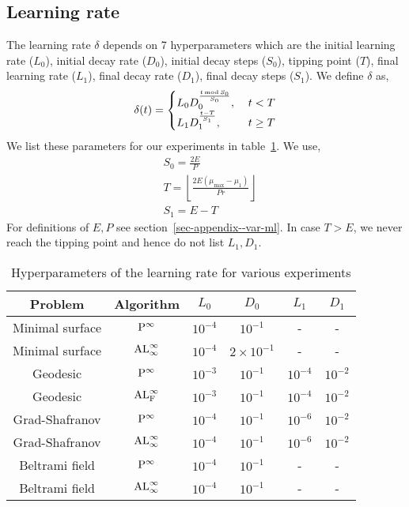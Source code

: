 \subsection{Learning rate}\label{ssec-rate--var-ml}
The learning rate $\delta$ depends on 7 hyperparameters which are the initial learning rate ($L_0$), initial decay rate ($D_0$), initial decay steps ($S_0$), tipping point ($T$), final learning rate ($L_1$), final decay rate ($D_1$), final decay steps ($S_1$). We define $\delta$ as,
\begin{align}
    \delta(t)=\begin{cases}
         L_0D_0^{\frac{t\,{\rm mod }\,S_0}{S_0}},\;&t<T\\
         L_1D_1^{\frac{t-T}{S_1}},\;&t\ge T\\
    \end{cases}
\end{align}
We list these parameters for our experiments in table~\ref{tab:rate--var-ml}. We use,
\begin{align}
    &S_0 = \frac{2E}{P}\\
    &T=\left\lfloor\frac{2E(\mu_{\max}-\mu_1)}{Pr}\right\rfloor\\
    &S_1=E-T
\end{align}
For definitions of $E,P$ see section~\ref{sec-appendix--var-ml}. In case $T>E$, we never reach the tipping point and hence do not list $L_1, D_1$.
\begin{table}[!ht]
\begin{center}
\begin{tabular}{ |c|c|c|c|c|c| } 
    \hline
    Problem & Algorithm& $L_0$ & $D_0$ &  $L_1$ & $D_1$ \\ 
    \hline
    Minimal surface& ${\rm P}^\infty$ & $10^{-4}$ & $10^{-1}$  &- &- \\
    \hline
    Minimal surface &${\rm AL}_\infty^\infty$ & $10^{-4}$ & $2\times10^{-1}$  &- &- \\
    \hline
    Geodesic&${\rm P}^\infty$ & $10^{-3}$ & $10^{-1}$  &$10^{-4}$ &$10^{-2}$ \\
    \hline
    Geodesic &${\rm AL}^\infty_{\rm F}$ & $10^{-3}$ & $10^{-1}$  &$10^{-4}$ &$10^{-2}$ \\
    \hline
   Grad-Shafranov&${\rm P}^\infty$ & $10^{-4}$ & $10^{-1}$  &$10^{-6}$ &$10^{-2}$ \\
    \hline
    Grad-Shafranov &${\rm AL}_\infty^\infty$ & $10^{-4}$ & $10^{-1}$  &$10^{-6}$ &$10^{-2}$ \\
    \hline
    Beltrami field&${\rm P}^\infty$ & $10^{-4}$ & $10^{-1}$  &- &- \\
    \hline
    Beltrami field &${\rm AL}_\infty^\infty$ & $10^{-4}$ & $10^{-1}$  &- &- \\
    \hline
   \end{tabular}
   \caption{ Hyperparameters of the learning rate for various experiments}
   \label{tab:rate--var-ml}
\end{center}
\end{table}